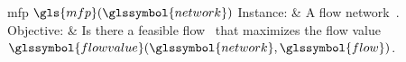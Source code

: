 \begin{problem}[framed]{\acrlong{mfp} $\gls{mfp}(\glssymbol{network})$}%
  Instance: & A flow network~\flownetworktuple.\\
  Objective: & Is there a feasible flow~ that maximizes the flow
  value~$\glssymbol{flowvalue}(\glssymbol{network}, \glssymbol{flow})$.
\end{problem}%
